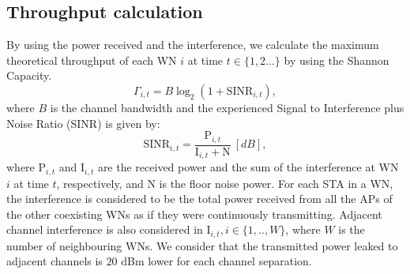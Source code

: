 \documentclass[conference]{IEEEtran}
\begin{document}
	\subsection{Throughput calculation}
	\label{section:throughput_calculation}
	
	By using the power received and the interference, we calculate the maximum theoretical throughput of each WN $i$ at time $t \in \{1,2 ...\}$ by using the Shannon Capacity.
	\begin{equation}
	\Gamma_{i,t} = B  \log_{2}(1 + \text{SINR}_{i, t}),
	\nonumber
	\label{eq:shannon_capacity}
	\end{equation}
	where $B$ is the channel bandwidth and the experienced Signal to Interference plus Noise Ratio (SINR) is given by:
	\begin{equation}
	\text{SINR}_{i,t} = \frac{\text{P}_{i,t}}{\text{I}_{i,t}+\text{N}} \: [dB],
	\nonumber
	\label{eq:sinr}
	\end{equation}
	where $\text{P}_{i,t}$ and $\text{I}_{i,t}$ are the received power and the sum of the interference at WN $i$ at time $t$, respectively, and N is the floor noise power. For each STA in a WN, the interference is considered to be the total power received from all the APs of the other coexisting WNs as if they were continuously transmitting. Adjacent channel interference is also considered in $\text{I}_{i,t}, i \in \{1,..,W\}$, where $W$ is the number of neighbouring WNs. We consider that the transmitted power leaked to adjacent channels is $20$ dBm lower for each channel separation.	
	
\end{document}
